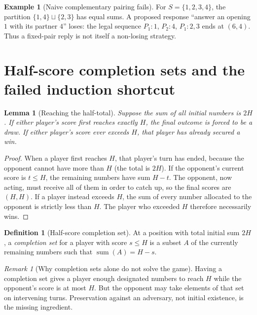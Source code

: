 \documentclass[11pt,a4paper]{article}
\newtheorem{lemma}[theorem]{Lemma}
\theoremstyle{definition}
\newtheorem{definition}[theorem]{Definition}
\newtheorem{example}[theorem]{Example}
\theoremstyle{remark}
\newtheorem{remark}[theorem]{Remark}
\newcommand{\sm}{\operatorname{sum}}
\begin{document}
\begin{example}[Naive complementary pairing fails]
For $S=\{1,2,3,4\}$, the partition
$\{1,4\}\sqcup\{2,3\}$ has equal sums.  A proposed response
``answer an opening $1$ with its partner $4$'' loses: the legal
sequence $P_1:1$, $P_2:4$, $P_1:2,3$ ends at $(6,4)$.
Thus a fixed-pair reply is not itself a non-losing strategy.
\end{example}

\section{Half-score completion sets and the failed induction shortcut}

\begin{lemma}[Reaching the half-total]
\label{lem:half}
Suppose the sum of all initial numbers is $2H$.
If either player's score first reaches \emph{exactly} $H$, the final
outcome is forced to be a draw.  If either player's score ever exceeds
$H$, that player has already secured a win.
\end{lemma}
\begin{proof}
When a player first reaches $H$, that player's turn has ended,
because the opponent cannot have more than $H$ (the total is $2H$).
If the opponent's current score is $t\le H$, the remaining numbers
have sum $H-t$.  The opponent, now acting, must receive all of them
in order to catch up, so the final scores are $(H,H)$.
If a player instead exceeds $H$, the sum of every number allocated
to the opponent is strictly less than $H$.  The player who exceeded
$H$ therefore necessarily wins.
\end{proof}

\begin{definition}[Half-score completion set]
At a position with total initial sum $2H$, a \emph{completion set}
for a player with score $s\le H$ is a subset $A$ of the currently
remaining numbers such that $\sm(A)=H-s$.
\end{definition}

\begin{remark}[Why completion sets alone do not solve the game]
Having a completion set gives a player enough designated numbers to
reach $H$ while the opponent's score is at most $H$.  But the
opponent may take elements of that set on intervening turns.
Preservation against an adversary, not initial existence, is the
missing ingredient.
\end{remark}
\end{document}
